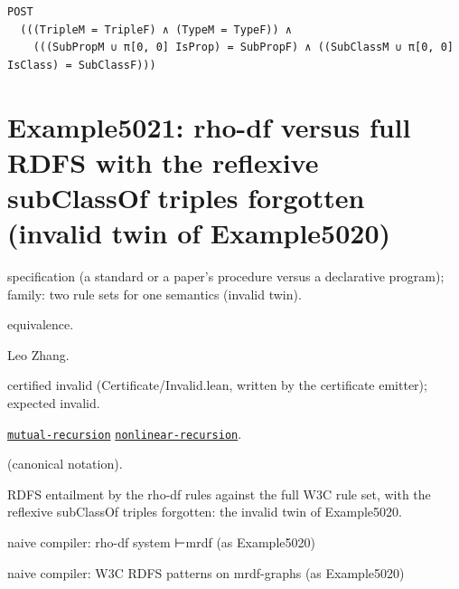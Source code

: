 \documentclass[10pt]{article}
\begin{document}
\begin{Verbatim}[fontsize=\tiny,breaklines=true,breakanywhere=true,frame=single,framesep=1.5mm]
POST
  (((TripleM = TripleF) ∧ (TypeM = TypeF)) ∧
    (((SubPropM ∪ π[0, 0] IsProp) = SubPropF) ∧ ((SubClassM ∪ π[0, 0] IsClass) = SubClassF)))
\end{Verbatim}

\Needspace{0.45\textheight}

\section{Example5021: rho-df versus full RDFS with the reflexive subClassOf triples forgotten (invalid twin of Example5020)}\label{case:Example5021}

\begin{description}[leftmargin=2.6cm,style=nextline,itemsep=1pt]

\item[Category] specification (a standard or a paper's procedure versus a declarative program); family: two rule sets for one semantics (invalid twin).

\item[Kind] equivalence.

\item[Contributors] Leo Zhang.

\item[Status] certified invalid (Certificate/Invalid.lean, written by the certificate emitter); expected invalid.

\item[Tags] \hyperref[tag:mutual-recursion]{\texttt{mutual-recursion}} \hyperref[tag:nonlinear-recursion]{\texttt{nonlinear-recursion}}.

\item[Input]  (canonical notation).

\item[Summary] RDFS entailment by the rho-df rules against the full W3C rule set, with the reflexive subClassOf triples forgotten: the invalid twin of Example5020.

\item[Sides] naive compiler: rho-df system ⊢mrdf (as Example5020) \par naive compiler: W3C RDFS patterns on mrdf-graphs (as Example5020)


\end{description}
\end{document}
